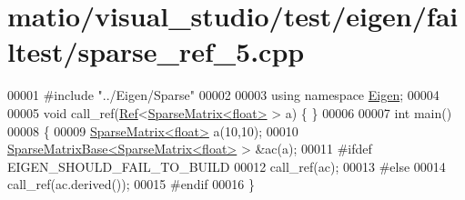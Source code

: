 \hypertarget{matio_2visual__studio_2test_2eigen_2failtest_2sparse__ref__5_8cpp_source}{}\section{matio/visual\+\_\+studio/test/eigen/failtest/sparse\+\_\+ref\+\_\+5.cpp}
\label{matio_2visual__studio_2test_2eigen_2failtest_2sparse__ref__5_8cpp_source}

\begin{DoxyCode}
00001 \textcolor{preprocessor}{#include "../Eigen/Sparse"}
00002 
00003 \textcolor{keyword}{using namespace }\hyperlink{namespace_eigen}{Eigen};
00004 
00005 \textcolor{keywordtype}{void} call\_ref(\hyperlink{group___core___module_class_eigen_1_1_ref}{Ref}<\hyperlink{group___sparse_core___module_class_eigen_1_1_sparse_matrix}{SparseMatrix<float>} > a) \{ \}
00006 
00007 \textcolor{keywordtype}{int} main()
00008 \{
00009   \hyperlink{group___sparse_core___module_class_eigen_1_1_sparse_matrix}{SparseMatrix<float>} a(10,10);
00010   \hyperlink{group___sparse_core___module_class_eigen_1_1_sparse_matrix_base}{SparseMatrixBase<SparseMatrix<float>} > &ac(a);
00011 \textcolor{preprocessor}{#ifdef EIGEN\_SHOULD\_FAIL\_TO\_BUILD}
00012   call\_ref(ac);
00013 \textcolor{preprocessor}{#else}
00014   call\_ref(ac.derived());
00015 \textcolor{preprocessor}{#endif}
00016 \}
\end{DoxyCode}
